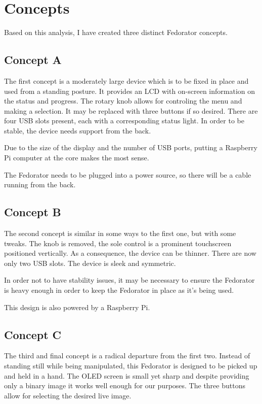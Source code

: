     \section{Concepts}
        Based on this analysis, I have created three distinct Fedorator concepts.
        \pagebreak
        \subsection{Concept A}
            The first concept is a moderately large device which is to be fixed in place and used from a standing posture.  It provides an LCD with on-screen information on the status and progress.  The rotary knob allows for controling the menu and making a selection.  It may be replaced with three buttons if so desired.  There are four USB slots present, each with a corresponding status light.  In order to be stable, the device needs support from the back.
            
            Due to the size of the display and the number of USB ports, putting a Raspberry Pi computer at the core makes the most sense.
            
            The Fedorator needs to be plugged into a power source, so there will be a cable running from the back.
            \newpage
        
        \subsection{Concept B}
            The second concept is similar in some ways to the first one, but with some tweaks.  The knob is removed, the sole control is a prominent touchscreen positioned vertically.  As a consequence, the device can be thinner.  There are now only two USB slots.  The device is sleek and symmetric.
            
            In order not to have stability issues, it may be necessary to ensure the Fedorator is heavy enough in order to keep the Fedorator in place as it's being used.
            
            This design is also powered by a Raspberry Pi.
            \newpage
        
        \subsection{Concept C}
            The third and final concept is a radical departure from the first two.  Instead of standing still while being manipulated, this Fedorator is designed to be picked up and held in a hand.  The OLED screen is small yet sharp and despite providing only a binary image it works well enough for our purposes.  The three buttons allow for selecting the desired live image.
            
